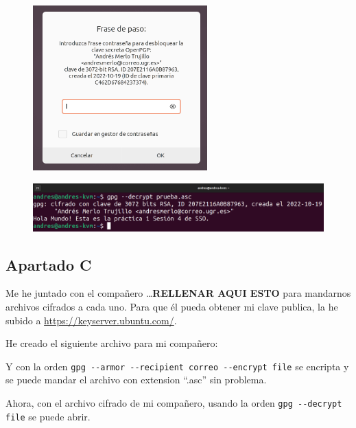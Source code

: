 \documentclass{article}
\begin{document}
\begin{figure}[H]
    \centering
    \includegraphics[width=0.6\textwidth]{imagenes/Captura desde 2022-10-19 17-07-30.png}
\end{figure}

\begin{figure}[H]
    \includegraphics[width=\textwidth]{imagenes/Captura desde 2022-10-19 17-07-50.png}
\end{figure}


\subsection*{Apartado C}

Me he juntado con el compañero \dots \textbf{RELLENAR AQUI ESTO} para mandarnos archivos cifrados a cada uno. Para que él pueda obtener mi clave publica, la he subido a \url{https://keyserver.ubuntu.com/}.

He creado el siguiente archivo para mi compañero:


Y con la orden \verb|gpg --armor --recipient correo --encrypt file| se encripta y se puede mandar el archivo con extension ``.asc'' sin problema.



Ahora, con el archivo cifrado de mi compañero, usando la orden \verb|gpg --decrypt file| se puede abrir.
\end{document}
